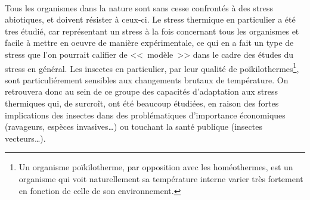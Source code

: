 

\paragraph{} %
\label{par:intro1}

Tous les organismes dans la nature sont sans cesse confrontés à des stress abiotiques, et doivent résister à ceux-ci.
Le stress thermique en particulier a été tres étudié, car représentant un stress à la fois concernant tous les organismes et facile à mettre en oeuvre de manière expérimentale, ce qui en a fait un type de stress que l'on pourrait califier de <<~modèle~>> dans le cadre des études du stress en général.
Les insectes en particulier, par leur qualité de poïkilothermes\footnote{Un organisme poïkilotherme, par opposition avec les homéothermes, est un organisme qui voit naturellement sa température interne varier très fortement en fonction de celle de son environnement.},
sont particuliérement sensibles aux changements brutaux de température.
On retrouvera donc au sein de ce groupe des capacités d'adaptation aux stress thermiques qui, de surcroît, ont été beaucoup étudiées, en raison des fortes implications des insectes dans des problématiques d'importance économiques (ravageurs, espèces invasives…) ou touchant la santé publique (insectes vecteurs…).

%



